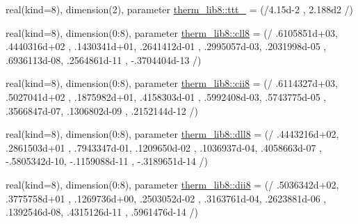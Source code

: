 \begin{DoxyCompactItemize}
\item 
real(kind=8), dimension(2), parameter \hyperlink{namespacetherm__lib8_a5879d4524f2706a75384614d311d91c7}{therm\+\_\+lib8\+::ttt\+\_} = (/4.\+15d-\/2 , 2.\+188d2 /)
\item 
real(kind=8), dimension(0\+:8), parameter \hyperlink{namespacetherm__lib8_a1f1e0a0dd53bbaf4515bc58ada29dba7}{therm\+\_\+lib8\+::cll8} = (/ .\+6105851d+03, .\+4440316d+02 , .\+1430341d+01, .\+2641412d-\/01 , .\+2995057d-\/03, .\+2031998d-\/05 , .\+6936113d-\/08, .\+2564861d-\/11 , -\/.\+3704404d-\/13 /)
\item 
real(kind=8), dimension(0\+:8), parameter \hyperlink{namespacetherm__lib8_aa9cd8b30beb20347cc9a45f40fd72baa}{therm\+\_\+lib8\+::cii8} = (/ .\+6114327d+03, .\+5027041d+02 , .\+1875982d+01, .\+4158303d-\/01 , .\+5992408d-\/03, .\+5743775d-\/05 , .\+3566847d-\/07, .\+1306802d-\/09 , .\+2152144d-\/12 /)
\item 
real(kind=8), dimension(0\+:8), parameter \hyperlink{namespacetherm__lib8_adbebbc1cdfb1af05d0cf1f50b2f0df90}{therm\+\_\+lib8\+::dll8} = (/ .\+4443216d+02, .\+2861503d+01 , .\+7943347d-\/01, .\+1209650d-\/02 , .\+1036937d-\/04, .\+4058663d-\/07 , -\/.\+5805342d-\/10, -\/.\+1159088d-\/11 , -\/.\+3189651d-\/14 /)
\item 
real(kind=8), dimension(0\+:8), parameter \hyperlink{namespacetherm__lib8_a3bfe64ca1b1761eb7fddc3aa544df182}{therm\+\_\+lib8\+::dii8} = (/ .\+5036342d+02, .\+3775758d+01 , .\+1269736d+00, .\+2503052d-\/02 , .\+3163761d-\/04, .\+2623881d-\/06 , .\+1392546d-\/08, .\+4315126d-\/11 , .\+5961476d-\/14 /)
\end{DoxyCompactItemize}
